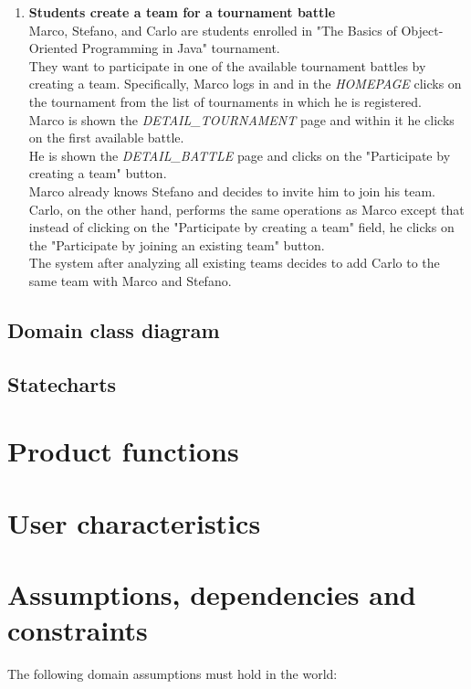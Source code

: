 \begin{enumerate}
		\item \textbf{Students create a team for a tournament battle}\\
Marco, Stefano, and Carlo are students enrolled in "The Basics of Object-Oriented Programming in Java" tournament.\\
They want to participate in one of the available tournament battles by creating a team.
Specifically, Marco logs in and in the \emph{HOMEPAGE} clicks on the tournament from the list of tournaments in which he is registered.\\
Marco is shown the \emph{DETAIL\_TOURNAMENT} page and within it he clicks on the first available battle.\\
He is shown the \emph{DETAIL\_BATTLE} page and clicks on the "Participate by creating a team" button.\\
Marco already knows Stefano and decides to invite him to join his team.\\
Carlo, on the other hand, performs the same operations as Marco except that instead of clicking on the "Participate by creating a team" field, he clicks on the "Participate by joining an existing team" button.\\
The system after analyzing all existing teams decides to add Carlo to the same team with Marco and Stefano.
		

    	
\end{enumerate}


\subsection{Domain class diagram}

\subsection{Statecharts}




\section{Product functions}



\section{User characteristics}



\section{Assumptions, dependencies and constraints}
The following domain assumptions must hold in the world:

